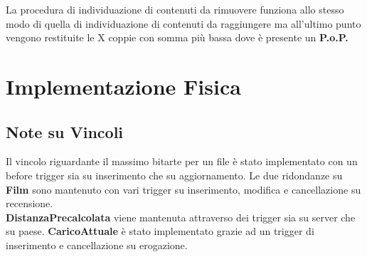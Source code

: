 \documentclass{article}
\begin{document}
La procedura di individuazione di contenuti da rimuovere funziona allo stesso modo di quella di individuazione di contenuti da raggiungere ma all'ultimo punto vengono restituite le X coppie con somma più bassa dove è presente un \textbf{P.o.P.} \\






\section{Implementazione Fisica}
\subsection{Note su Vincoli}
Il vincolo riguardante il massimo bitarte per un file è stato implementato con un before trigger sia su inserimento che su aggiornamento. Le due ridondanze su \textbf{Film} sono mantenuto con vari trigger su inserimento, modifica e cancellazione su recensione. \\
\textbf{DistanzaPrecalcolata} viene mantenuta attraverso dei trigger sia su server che su paese. \textbf{CaricoAttuale} è stato implementato grazie ad un trigger di inserimento e cancellazione su erogazione. 
\end{document}
